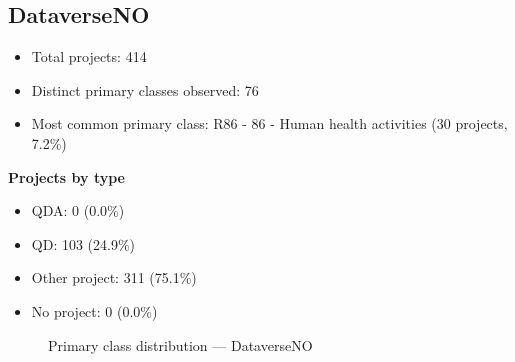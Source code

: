 \subsection{DataverseNO}

\begin{itemize}
    \item Total projects: 414
    \item Distinct primary classes observed: 76
    \item Most common primary class: R86 - 86 - Human health activities (30 projects, 7.2\%)
\end{itemize}
\textbf{Projects by type}
\begin{itemize}
    \item QDA: 0 (0.0\%)
    \item QD: 103 (24.9\%)
    \item Other project: 311 (75.1\%)
    \item No project: 0 (0.0\%)
\end{itemize}

\begin{figure}[h]
    \centering
    
    \caption{Primary class distribution --- DataverseNO}
\end{figure}

